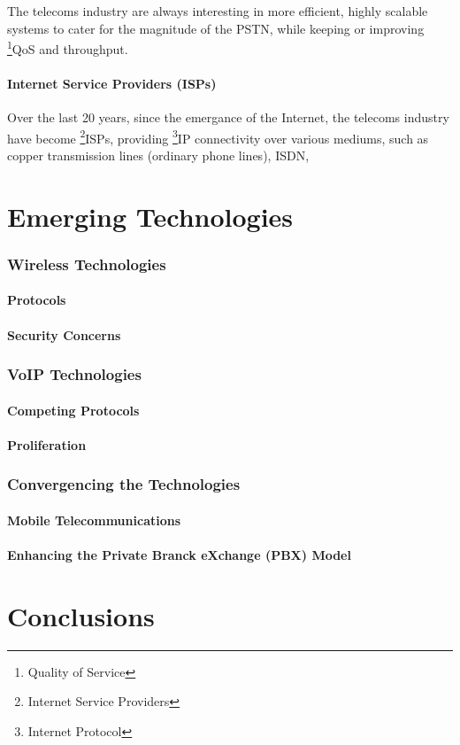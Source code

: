 \documentclass[a4paper,12pt]{article}
\begin{document}
The telecoms industry are always interesting in more efficient, highly
scalable systems to cater for the magnitude of the PSTN, while keeping
or improving \footnote{Quality of Service}{QoS} and throughput.

\subsection{Internet Service Providers (ISPs)}

Over the last 20 years, since the emergance of the Internet, the
telecoms industry have become \footnote{Internet Service
Providers}{ISPs}, providing \footnote{Internet Protocol}{IP}
connectivity over various mediums, such as copper transmission lines
(ordinary phone lines), ISDN,  

\part{Emerging Technologies}

\section{Wireless Technologies}

\subsection{Protocols}

\subsection{Security Concerns}

\section{VoIP Technologies}

\subsection{Competing Protocols}

\subsection{Proliferation}

\section{Convergencing the Technologies}

\subsection{Mobile Telecommunications}

\subsection{Enhancing the Private Branck eXchange (PBX) Model}

\part{Conclusions}




\end{document}
